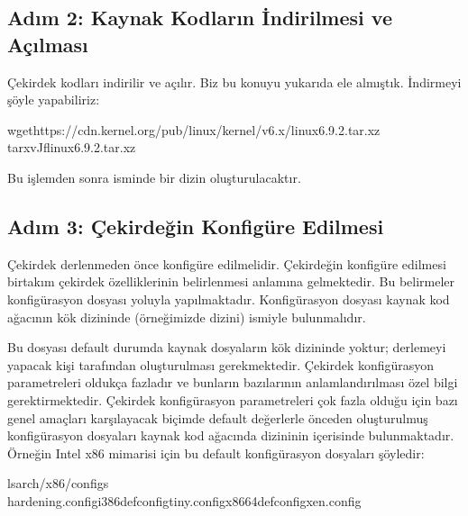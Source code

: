 \documentclass[a4paper,10pt,turkish]{sphinxmanual}
\begin{document}
\subsection{Adım 2: Kaynak Kodların İndirilmesi ve Açılması}
\label{\detokenize{kernelcompilation:adim-2-kaynak-kodlarin-indirilmesi-ve-acilmasi}}
\sphinxAtStartPar
Çekirdek kodları indirilir ve açılır. Biz bu konuyu yukarıda ele almıştık. İndirmeyi şöyle
yapabiliriz:

\begin{sphinxVerbatim}[commandchars=\\\{\}]
\PYGZdl{}wgethttps://cdn.kernel.org/pub/linux/kernel/v6.x/linux\PYGZhy{}6.9.2.tar.xz
\PYGZdl{}tar\PYGZhy{}xvJflinux\PYGZhy{}6.9.2.tar.xz
\end{sphinxVerbatim}

\sphinxAtStartPar
Bu işlemden sonra  isminde bir dizin oluşturulacaktır.


\subsection{Adım 3: Çekirdeğin Konfigüre Edilmesi}
\label{\detokenize{kernelcompilation:adim-3-cekirdegin-konfigure-edilmesi}}
\sphinxAtStartPar
Çekirdek derlenmeden önce konfigüre edilmelidir. Çekirdeğin konfigüre edilmesi birtakım çekirdek
özelliklerinin belirlenmesi anlamına gelmektedir. Bu belirmeler konfigürasyon dosyası yoluyla
yapılmaktadır. Konfigürasyon dosyası kaynak kod ağacının kök dizininde (örneğimizde 
dizini)  ismiyle bulunmalıdır.

\sphinxAtStartPar
Bu  dosyası default durumda kaynak dosyaların kök dizininde yoktur; derlemeyi yapacak
kişi tarafından oluşturulması gerekmektedir. Çekirdek konfigürasyon parametreleri oldukça fazladır
ve bunların bazılarının anlamlandırılması özel bilgi gerektirmektedir. Çekirdek konfigürasyon
parametreleri çok fazla olduğu için bazı genel amaçları karşılayacak biçimde default değerlerle
önceden oluşturulmuş konfigürasyon dosyaları kaynak kod ağacında  dizininin
içerisinde bulunmaktadır. Örneğin Intel x86 mimarisi için bu default konfigürasyon dosyaları şöyledir:

\begin{sphinxVerbatim}[commandchars=\\\{\}]
\PYGZdl{}lsarch/x86/configs
hardening.configi386\PYGZus{}defconfigtiny.configx86\PYGZus{}64\PYGZus{}defconfigxen.config
\end{sphinxVerbatim}
\end{document}

